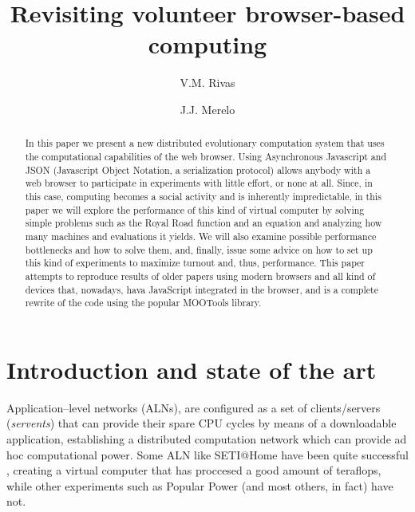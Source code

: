 \documentclass{llncs}
\begin{document}

\title{Revisiting volunteer browser-based computing}

\author{V.M. Rivas  \and J.J. Merelo }
\maketitle

\begin{abstract}
In this paper we present a new distributed
 evolutionary computation system that uses the computational capabilities of the
 web browser. Using 
Asynchronous Javascript and JSON (Javascript Object Notation, a
 serialization protocol) allows anybody with a web browser to participate in experiments with little effort, or none at all. Since, in
this case, computing becomes a social activity and is inherently
impredictable, in this
 paper we will explore the performance of this kind of virtual
 computer by solving simple problems such as the
 Royal Road function and an equation and analyzing how many machines and evaluations
it yields. We will also examine possible performance bottlenecks
 and how to solve them, and, finally, issue some advice on how to set
 up this kind of experiments to maximize turnout and, thus,
 performance. This paper attempts to reproduce results of older papers
 using modern browsers and all kind of devices that, nowadays, hava
 JavaScript integrated in the browser, and is a complete rewrite of
 the code using the popular MOOTools library. 
\end{abstract}


\section{Introduction and state of the art}
\label{sec:intro}
Application--level networks (ALNs), are configured as a set of
clients/servers ({\em servents}) that
can provide their spare CPU cycles by means of a downloadable
application, establishing a distributed computation network which can
provide ad hoc computational power. Some ALN
like SETI@Home have been quite successful \cite{david-seti:home},
creating a virtual computer that has proccesed a good amount of
teraflops, while other 
experiments such as Popular Power (and most others, in fact) have not\cite{DBLP:conf/p2p/2005lncs}. 
\end{document}
